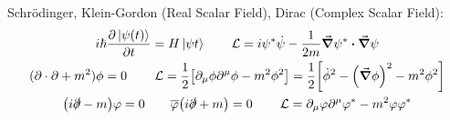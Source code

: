 Schrödinger, Klein-Gordon (Real Scalar Field), Dirac (Complex Scalar Field):
\begin{gather*}
    i\hbar\pdv{\ket{\psi(t)}}{t} = H\ket{\psi{t}}
    \qquad
    \Lc = i\psi^*\dot{\psi} - \frac{1}{2m}\grad{\psi^*}\vdot\grad{\psi}
    \\
    (\partial\cdot\partial + m^2)\phi = 0
    \qquad
    \Lc
    = \frac{1}{2}\qty[\partial_\mu\phi\partial^\mu\phi - m^2\phi^2]
    = \frac{1}{2}\qty[\dot{\phi}^2 - \qty(\grad{\phi})^2 - m^2\phi^2]
    \\
    \qty(i\slashed{\partial}-m)\varphi = 0
    \qquad
    \overline{\varphi}\qty(i\slashed{\partial}+m) = 0
    \qquad
    \Lc
    = \partial_\mu\varphi\partial^\mu\varphi^* - m^2\varphi\varphi^*
\end{gather*}
